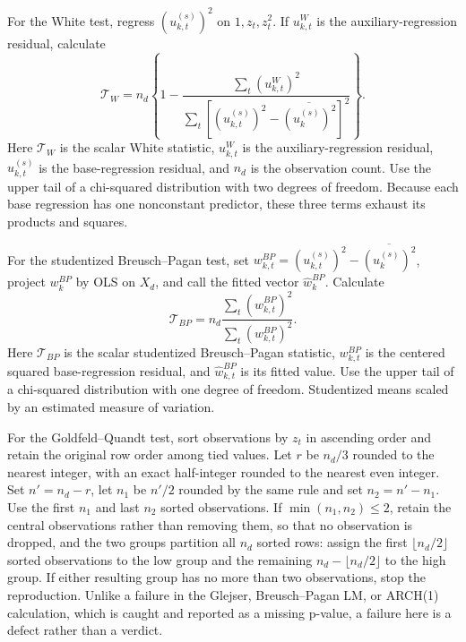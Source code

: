 \documentclass[11pt]{article}
\begin{document}
For the White test, regress \((u_{k,t}^{(s)})^2\) on \(1,z_t,z_t^2\). If
\(u_{k,t}^{W}\) is the auxiliary-regression
residual, calculate
\[
 \mathcal T_W=n_d\left\{1-\frac{\sum_t(u_{k,t}^{W})^2}
 {\sum_t[(u_{k,t}^{(s)})^2-\overline{(u_k^{(s)})^2}]^2}\right\}.
\]
Here \(\mathcal T_W\) is the scalar White statistic, \(u_{k,t}^W\) is the auxiliary-regression
residual, \(u_{k,t}^{(s)}\) is the base-regression residual, and \(n_d\) is the observation count. Use
the upper tail of a chi-squared distribution with two degrees of freedom. Because each base regression has
one nonconstant predictor, these three terms exhaust its products and squares.

For the studentized Breusch--Pagan test, set
\(w_{k,t}^{BP}=(u_{k,t}^{(s)})^2-\overline{(u_k^{(s)})^2}\), project
\(w_k^{BP}\) by OLS on \(X_d\), and call the fitted vector \(\widehat w_k^{BP}\). Calculate
\[
 \mathcal T_{BP}=n_d\frac{\sum_t(\widehat w_{k,t}^{BP})^2}
 {\sum_t(w_{k,t}^{BP})^2}.
\]
Here \(\mathcal T_{BP}\) is the scalar studentized Breusch--Pagan statistic, \(w_{k,t}^{BP}\) is
the centered squared base-regression residual, and \(\widehat w_{k,t}^{BP}\) is its fitted value.
Use the upper tail of a chi-squared distribution with one degree of freedom. Studentized means
scaled by an estimated measure of variation.

For the Goldfeld--Quandt test, sort observations by \(z_t\) in ascending order and retain the
original row order among tied values. Let \(r\) be \(n_d/3\) rounded to the nearest integer, with an
exact half-integer rounded to the nearest even integer. Set \(n'=n_d-r\), let \(n_1\) be \(n'/2\)
rounded by the same rule and set \(n_2=n'-n_1\). Use the first \(n_1\) and last \(n_2\) sorted
observations. If \(\min(n_1,n_2)\le2\), retain the central observations rather than removing them, so
that no observation is dropped, and the two groups partition all \(n_d\) sorted rows: assign the
first \(\lfloor n_d/2\rfloor\) sorted observations to the low group and the remaining
\(n_d-\lfloor n_d/2\rfloor\) to the high group. If either resulting
group has no more than two observations, stop the reproduction. Unlike a failure in the Glejser,
Breusch--Pagan LM, or ARCH(1) calculation, which is caught and reported as a missing p-value, a
failure here is a defect rather than a verdict.
\end{document}

